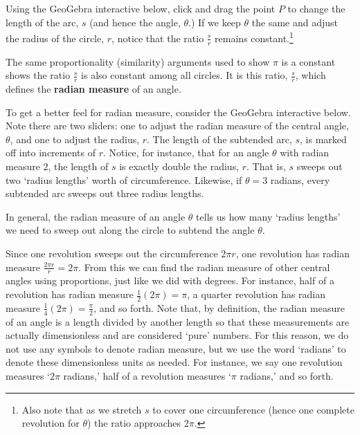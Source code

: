 \documentclass{ximera}
\begin{document}
Using the GeoGebra interactive below, click and drag the point $P$ to change the length of the arc, $s$  (and hence the angle, $\theta$.) If we keep $\theta$ the same and adjust the radius of the circle, $r$, notice that the ratio $\frac{s}{r}$ remains constant.\footnote{Also note that as we stretch $s$ to cover one circumference (hence one complete revolution for $\theta$) the ratio approaches $2\pi$.} 

\begin{center}
\end{center}

The same proportionality (similarity) arguments used to show $\pi$ is a constant shows the ratio $\frac{s}{r}$ is also constant among all circles.  It is this ratio, $\frac{s}{r}$, which defines the \textbf{radian measure} of an angle.

To get a better feel for radian measure, consider the GeoGebra interactive below. Note there are two sliders: one to adjust the radian measure of the central angle, $\theta$, and one to adjust the radius, $r$.  The length of the subtended arc, $s$, is marked off into increments of $r$.  Notice, for instance, that for an angle $\theta$ with radian measure $2$, the length of $s$ is exactly double the radius, $r$.  That is, $s$ sweeps out two `radius lengths' worth of circumference.  Likewise, if $\theta = 3$ radians, every subtended arc sweeps out three radius lengths.

\begin{center}
\end{center}

In general,  the radian measure of an angle $\theta$ tells us how many `radius lengths' we need to sweep out along the circle to subtend the angle $\theta$.  

Since one revolution sweeps out the circumference $2\pi r$, one revolution has radian measure $\frac{2 \pi r}{r} = 2 \pi$.  From this we can find the radian measure of other central angles using proportions, just like we did with degrees.    For instance, half of a revolution has radian measure  $\frac{1}{2} (2 \pi) = \pi$, a quarter revolution has radian measure $\frac{1}{4} (2 \pi) = \frac{\pi}{2}$, and so forth.   Note that, by definition, the radian measure of an angle is a length divided by another length so that these measurements are actually dimensionless and are considered `pure' numbers. For this reason, we do not use any symbols to denote radian measure, but we use the word `radians' to denote these dimensionless units as needed. For instance, we say one revolution measures `$2\pi$ radians,' half of a revolution measures `$\pi$ radians,' and so forth.  
\end{document}

